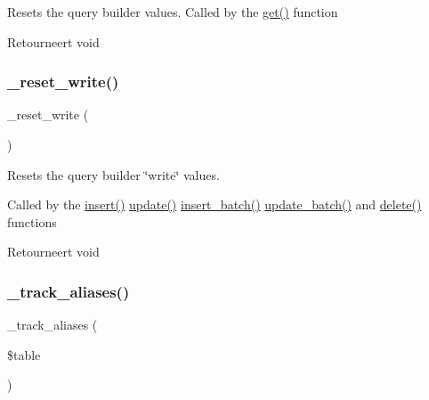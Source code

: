 Resets the query builder values. Called by the \mbox{\hyperlink{class_c_i___d_b__query__builder_a02c629b7cdb54c95ccc23c21d910320d}{get()}} function

\begin{DoxyReturn}{Retourneert}
void 
\end{DoxyReturn}
\mbox{\label{class_c_i___d_b__query__builder_ae49808f6becc0366eef957756c8309e4}} 
\subsubsection{\texorpdfstring{\_reset\_write()}{\_reset\_write()}}
{\footnotesize\ttfamily \+\_\+reset\+\_\+write (\begin{DoxyParamCaption}{ }\end{DoxyParamCaption})\hspace{0.3cm}{\ttfamily [protected]}}

Resets the query builder \char`\"{}write\char`\"{} values.

Called by the \mbox{\hyperlink{class_c_i___d_b__query__builder_a487027d8e320a1ea657af2d7e61df389}{insert()}} \mbox{\hyperlink{class_c_i___d_b__query__builder_a130a26da2dd4e4582ee18f42d71fe6e4}{update()}} \mbox{\hyperlink{class_c_i___d_b__query__builder_ac35c8959b57eb08416e09c094371aaca}{insert\+\_\+batch()}} \mbox{\hyperlink{class_c_i___d_b__query__builder_a718928dc54d935761439538836f1e70d}{update\+\_\+batch()}} and \mbox{\hyperlink{class_c_i___d_b__query__builder_a482722b9989c53ed8ecd68b22df64507}{delete()}} functions

\begin{DoxyReturn}{Retourneert}
void 
\end{DoxyReturn}
\mbox{\label{class_c_i___d_b__query__builder_afb539c1557a7cb20a190f5b68d96b74a}} 
\subsubsection{\texorpdfstring{\_track\_aliases()}{\_track\_aliases()}}
{\footnotesize\ttfamily \+\_\+track\+\_\+aliases (\begin{DoxyParamCaption}\item[{}]{\$table }\end{DoxyParamCaption})\hspace{0.3cm}{\ttfamily [protected]}}

